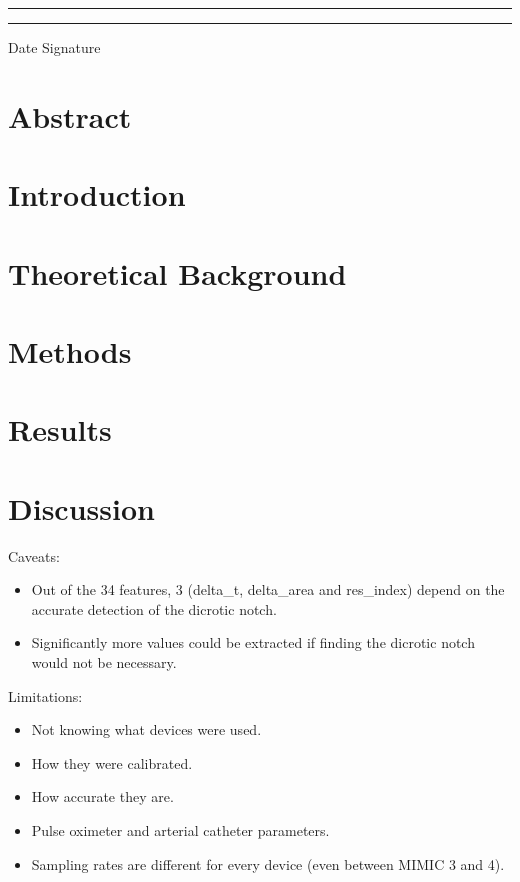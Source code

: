 \documentclass[12pt, bibliography=totoc]{scrartcl}
\begin{document}
    \rule{4cm}{0.5mm} \tab \qquad \qquad \rule{4cm}{0.5mm}

    Date \tab \qquad \qquad Signature

    \newpage
    \doublespacing
    \tableofcontents

    \newpage
    \onehalfspacing


    \section{Abstract}\label{sec:abstract}


    \section{Introduction}
    \label{sec:introduction}
    


    \section{Theoretical Background}
    \label{sec:background}
    


    \section{Methods}
    \label{sec:methods}
    


    \section{Results}
    \label{sec:results}
    


    \section{Discussion}
    \label{sec:discussion}

    Caveats:
    \begin{itemize}
        \item Out of the 34 features, 3 (delta\_t, delta\_area and res\_index) depend on the accurate detection of the dicrotic notch.
        \item Significantly more values could be extracted if finding the dicrotic notch would not be necessary.
    \end{itemize}

    Limitations:
    \begin{itemize}
        \item Not knowing what devices were used.
        \item How they were calibrated.
        \item How accurate they are.
        \item Pulse oximeter and arterial catheter parameters.
        \item Sampling rates are different for every device (even between MIMIC 3 and 4).
    \end{itemize}
\end{document}
